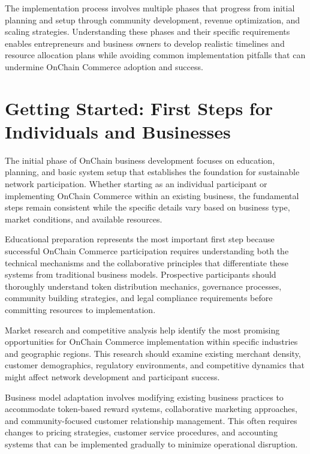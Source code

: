\documentclass[
  Letterpaper,
]{scrbook}
\begin{document}
The implementation process involves multiple phases that progress from
initial planning and setup through community development, revenue
optimization, and scaling strategies. Understanding these phases and
their specific requirements enables entrepreneurs and business owners to
develop realistic timelines and resource allocation plans while avoiding
common implementation pitfalls that can undermine OnChain Commerce
adoption and success.

\section{Getting Started: First Steps for Individuals and
Businesses}\label{getting-started-first-steps-for-individuals-and-businesses}

The initial phase of OnChain business development focuses on education,
planning, and basic system setup that establishes the foundation for
sustainable network participation. Whether starting as an individual
participant or implementing OnChain Commerce within an existing
business, the fundamental steps remain consistent while the specific
details vary based on business type, market conditions, and available
resources.

Educational preparation represents the most important first step because
successful OnChain Commerce participation requires understanding both
the technical mechanisms and the collaborative principles that
differentiate these systems from traditional business models.
Prospective participants should thoroughly understand token distribution
mechanics, governance processes, community building strategies, and
legal compliance requirements before committing resources to
implementation.

Market research and competitive analysis help identify the most
promising opportunities for OnChain Commerce implementation within
specific industries and geographic regions. This research should examine
existing merchant density, customer demographics, regulatory
environments, and competitive dynamics that might affect network
development and participant success.

Business model adaptation involves modifying existing business practices
to accommodate token-based reward systems, collaborative marketing
approaches, and community-focused customer relationship management. This
often requires changes to pricing strategies, customer service
procedures, and accounting systems that can be implemented gradually to
minimize operational disruption.
\end{document}
